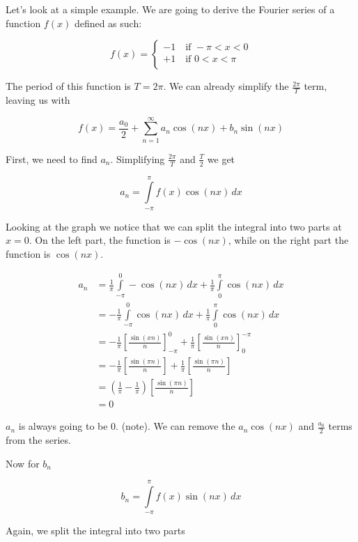 \documentclass{article}
\newcommand{\integral}[4]{\int\limits_{#1}^{#2} #3\,d#4}
\begin{document}
Let's look at a simple example. We are going to derive the Fourier series of a function \(f(x)\) defined as such:

\[
    f(x)=
    \begin{cases}
        -1\quad \text{if } -\pi < x < 0 \\
        +1\quad \text{if } 0 < x < \pi \\
    \end{cases}
\]

The period of this function is \(T=2\pi\). We can already simplify the \(\frac{2\pi}{T}\) term, leaving us with

\[
    f(x)=\frac{a_0}{2} + \sum_{n=1}^{\infty} a_n \cos(nx) + b_n \sin(nx)
\]

First, we need to find \(a_n\). Simplifying \(\frac{2\pi}{T}\) and \(\frac{T}{2}\) we get

\[
    a_n=\integral{-\pi}{\pi}{f(x)\cos(nx)}{x}
\]

Looking at the graph we notice that we can split the integral into two parts at \(x=0\).
On the left part, the function is \(-\cos(nx)\), while on the right part the function is \(\cos(nx)\).

\begin{align*}
    a_n &=
    \frac{1}{\pi} \integral{-\pi}{0}{-\cos(nx)}{x} +
    \frac{1}{\pi} \integral{0}{\pi}{\cos(nx)}{x} \\
    &= -\frac{1}{\pi} \integral{-\pi}{0}{\cos(nx)}{x} +
    \frac{1}{\pi} \integral{0}{\pi}{\cos(nx)}{x} \\
    &= -\frac{1}{\pi} {\left[\frac{\sin(xn)}{n}\right]}_{-\pi}^{0} +
    \frac{1}{\pi} {\left[\frac{\sin(xn)}{n}\right]}_{0}^{-\pi} \\
    &= -\frac{1}{\pi} \left[\frac{\sin(\pi n)}{n}\right] +
    \frac{1}{\pi} \left[\frac{\sin(\pi n)}{n}\right] \\
    &= \left(\frac{1}{\pi}-\frac{1}{\pi}\right) \left[\frac{\sin(\pi n)}{n}\right] \\
    &= 0
\end{align*}

\(a_n\) is always going to be 0. (note). We can remove the \(a_n \cos(nx)\) and \(\frac{a_0}{2}\) terms from the series.

Now for \(b_n\)

\[
    b_n=\integral{-\pi}{\pi}{f(x)\sin(nx)}{x}
\]

Again, we split the integral into two parts
\end{document}
